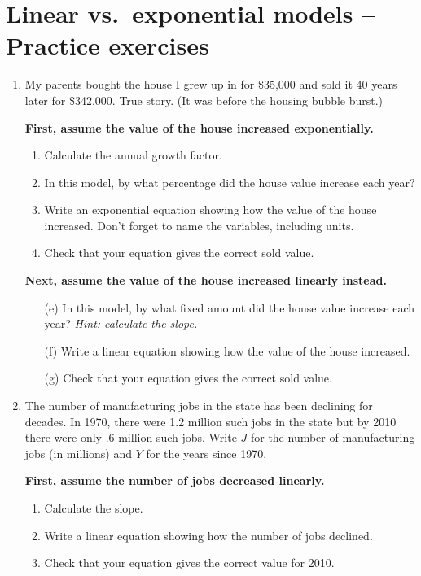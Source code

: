 \section{Linear vs.\ exponential models -- Practice exercises}

\begin{enumerate}

\item My parents bought the house I grew up in for \$35,000 and sold it 40 years later for \$342,000. True story.  (It was before the housing bubble burst.)

\textbf{First, assume the value of the house increased exponentially.}
\begin{enumerate}
\item Calculate the annual growth factor. \vfill
\item In this model, by what percentage did the house value increase each year?  \bigskip
\item Write an exponential equation showing how the value of the house increased.   Don't forget to name the variables, including units. \vfill 
\item Check that your equation gives the correct sold value. \bigskip
\end{enumerate}

\textbf{Next, assume the value of the house increased linearly instead.}
\begin{enumerate} 
\item [(e)] In this model, by what fixed amount did the house value increase each year?  \emph{Hint:  calculate the slope.} \vfill
\item [(f)] Write a linear equation showing how the value of the house increased.  \vfill
\item [(g)] Check that your equation gives the correct sold value.  \bigskip
\end{enumerate}

\newpage %

\item The number of manufacturing jobs in the state has been declining for decades. In 1970, there were 1.2 million such jobs in the state but by 2010 there were only .6 million such jobs.   Write $J$ for the number of manufacturing jobs (in millions) and $Y$ for the years since 1970.

\textbf{First, assume the number of jobs decreased linearly.}
\begin{enumerate}
\item Calculate the slope. \vfill
\item Write a linear equation showing how the number of jobs declined.  \vfill
\item Check that your equation gives the correct value for 2010. \bigskip
\end{enumerate}


\end{enumerate}
